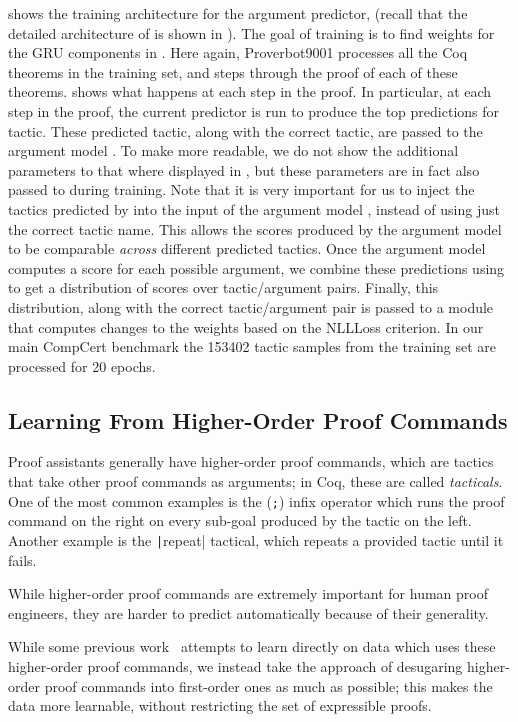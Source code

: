 \documentclass[sigplan,screen]{acmart}
\newcommand{\name}{Proverbot9001\xspace}
\newcommand{\coqinline}[1]{\texttt|#1|}
\renewcommand{\>}{\quad}
\newcommand{\cut}[1]{}
\begin{document}
 shows the training architecture for the argument predictor,  (recall that the detailed architecture of  is shown in ).
The goal of training is to find weights for the GRU components in .
Here again, \name{} processes all the Coq theorems in the training set, and steps through the proof of each of these theorems.  shows what happens at each step in the proof.
In particular, at each step in the proof, the current  predictor is run to produce the top predictions for tactic.
These predicted tactic, along with the correct tactic, are passed to the argument model .
To make  more readable, we do not show the additional parameters to  that where displayed in , but these parameters are in fact also passed to  during training.
Note that it is very important for us to inject the tactics predicted by  into the input of the argument model , instead of using just the correct tactic name.
This allows the scores produced by the argument model to be comparable \emph{across} different predicted tactics.
Once the argument model  computes a score for each possible argument, we combine these predictions using  to get a distribution of scores over tactic/argument pairs.
Finally, this distribution, along with the correct tactic/argument pair is passed to a module that computes changes to the weights based on the NLLLoss criterion.
In our main CompCert benchmark the 153402 tactic samples from the training set are processed for 20 epochs.




\subsection{Learning From Higher-Order Proof Commands}

Proof assistants generally have higher-order proof commands, which are tactics that take other proof commands as arguments;
in Coq, these are called \emph{tacticals}.
One of the most common examples is the (\verb-;-) infix operator which runs the proof command on the right on every sub-goal produced by the tactic on the left.
Another example is the \coqinline{repeat} tactical, which repeats a provided tactic until it fails.

While higher-order proof commands are extremely important for human proof engineers, they are harder to predict automatically because of their generality.
\cut{Indeed, effectively predicting such higher-order tactics would require learning deeper contextual features.
}
While some previous work~\cite{coqgym} attempts to learn directly on data which uses these higher-order proof commands, we instead take the approach of desugaring higher-order proof commands into first-order ones as much as possible;
this makes the data more learnable, without restricting the set of expressible proofs.
\end{document}
